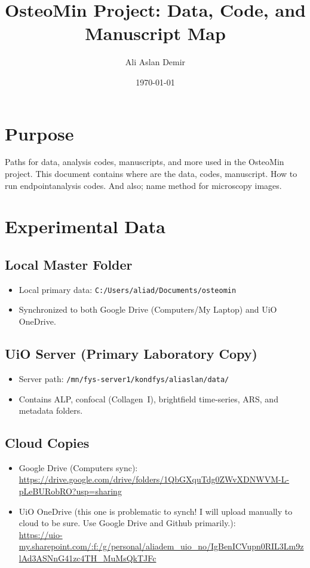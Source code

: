 \documentclass[11pt,a4paper]{article}
\title{OsteoMin Project: Data, Code, and Manuscript Map}
\author{Ali Aslan Demir}
\date{\today}
\newcommand{\localdata}{C:/Users/aliad/Documents/osteomin}
\newcommand{\uioserverdata}{/mn/fys-server1/kondfys/aliaslan/data/}
\newcommand{\googledata}{https://drive.google.com/drive/folders/1QbGXquTdg0ZWvXDNWVM-L-pLeBURobRO?usp=sharing}
\newcommand{\onedrivedata}{https://uio-my.sharepoint.com/:f:/g/personal/aliadem_uio_no/IgBenICVupn0RIL3Lm9zlAd3ASNnG41zc4TH_MuMsQkTJFc}
\begin{document}
\maketitle

\section{Purpose}
Paths for data, analysis codes, manuscripts, and more used in the OsteoMin project. This document contains where are the data, codes, manuscript. How to run endpointanalysis codes. And also; name method for microscopy images.

\section{Experimental Data}

\subsection{Local Master Folder}
\begin{itemize}
  \item Local primary data: \texttt{\localdata}
  \item Synchronized to both Google Drive (Computers/My Laptop) and UiO OneDrive.
\end{itemize}

\subsection{UiO Server (Primary Laboratory Copy)}
\begin{itemize}
  \item Server path: \texttt{\uioserverdata}
  \item Contains ALP, confocal (Collagen~I), brightfield time-series, ARS, and metadata folders.
\end{itemize}

\subsection{Cloud Copies}
\begin{itemize}
  \item Google Drive (Computers sync): \\[2pt]\url{\googledata}
  \item UiO OneDrive (this one is problematic to synch! I will upload manually to cloud to be sure. Use Google Drive and Github primarily.): \\[2pt]\url{\onedrivedata}
\end{itemize}
\end{document}
